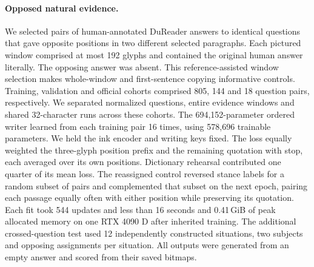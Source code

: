 \paragraph{Opposed natural evidence.} We selected pairs of human-annotated DuReader answers to identical questions that gave opposite positions in two different selected paragraphs. Each pictured window comprised at most 192 glyphs and contained the original human answer literally. The opposing answer was absent. This reference-assisted window selection makes whole-window and first-sentence copying informative controls. Training, validation and official cohorts comprised 805, 144 and 18 question pairs, respectively. We separated normalized questions, entire evidence windows and shared 32-character runs across these cohorts. The 694,152-parameter ordered writer learned from each training pair 16 times, using 578,696 trainable parameters. We held the ink encoder and writing keys fixed. The loss equally weighted the three-glyph position prefix and the remaining quotation with stop, each averaged over its own positions. Dictionary rehearsal contributed one quarter of its mean loss. The reassigned control reversed stance labels for a random subset of pairs and complemented that subset on the next epoch, pairing each passage equally often with either position while preserving its quotation. Each fit took 544 updates and less than 16 seconds and 0.41\,GiB of peak allocated memory on one RTX 4090 D after inherited training. The additional crossed-question test used 12 independently constructed situations, two subjects and opposing assignments per situation. All outputs were generated from an empty answer and scored from their saved bitmaps.
